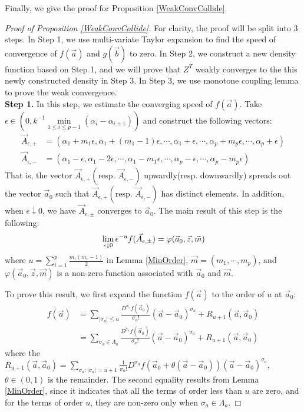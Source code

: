 Finally, we give the proof for Proposition \ref{WeakConvCollide}. 
\begin{proof}[Proof of Proposition \ref{WeakConvCollide}] For clarity, the proof will be split into $3$ steps. In Step 1, we use multi-variate Taylor expansion to find the speed of convergence of $f(\vec{a})$ and $g(\vec{b})$ to zero. In Step 2, we construct a new density function based on Step 1, and we will prove that $Z^{T}$ weakly converges to the this newly constructed density in Step 3. In Step 3, we use monotone coupling lemma to prove the weak convergence.\\
\textbf{Step 1. }In this step, we estimate the converging speed of $f(\vec{a})$. Take $\epsilon\in (0,k^{-1}\min\limits_{1\leq i\leq p-1}(\alpha_{i}-\alpha_{i+1}))$ and construct the following vectors:
\begin{align*}
	\vec{A}_{\epsilon,+}&=(\alpha_{1}+m_{1}\epsilon, \alpha_{1}+(m_{1}-1)\epsilon,\cdots,\alpha_{1}+\epsilon,\cdots,\alpha_{p}+m_{p}\epsilon,\cdots,\alpha_{p}+\epsilon)\\
	\vec{A}_{\epsilon,-}&=(\alpha_{1}-\epsilon, \alpha_{1}-2\epsilon,\cdots,\alpha_{1}-m_{1}\epsilon,\cdots,\alpha_{p}-\epsilon,\cdots,\alpha_{p}-m_{p}\epsilon)
\end{align*}
That is, the vector $\vec{A}_{\epsilon,+}(\text{resp. }\vec{A}_{\epsilon,-})$ upwardly(resp. downwardly) spreads out the vector $\vec{a}_{0}$ such that $\vec{A}_{\epsilon,+}(\text{resp. }\vec{A}_{\epsilon,-})$ has distinct elements. In addition, when $\epsilon\downarrow 0$, we have $\vec{A}_{\epsilon,\pm}$ converges to $\vec{a}_{0}$. The main result of this step is the following:
\begin{align}{\label{ConvSpeed}}
	\lim_{\epsilon\downarrow 0}\epsilon^{-u}f(\vec{A}_{\epsilon,\pm})=\varphi(\vec{a}_{0},\vec{z},\vec{m})
\end{align}
where $u=\sum_{i=1}^{p}\frac{m_{i}(m_{i}-1)}{2}$ in Lemma \ref{MinOrder}, $\vec{m}=(m_{1},\cdots,m_{p})$, and $\varphi(\vec{a}_{0},\vec{z},\vec{m})$ is a non-zero function associated with $\vec{a}_{0}$ and $\vec{m}$.

To prove this result, we first expand the function $f(\vec{a})$ to the order of $u$ at $\vec{a}_{0}$:
\begin{align*}
	f(\vec{a})&=\sum_{|\sigma_{a}|\leq u}\frac{D^{\sigma_{a}}f(\vec{a}_{0})}{\sigma_{a}!}(\vec{a}-\vec{a}_{0})^{\sigma_{a}}+R_{u+1}(\vec{a},\vec{a}_{0})\\
	&= \sum_{\sigma_{a}\in \Lambda_{a}}\frac{D^{\sigma_{a}}f(\vec{a}_{0})}{\sigma_{a}!}(\vec{a}-\vec{a}_{0})^{\sigma_{a}}+R_{u+1}(\vec{a},\vec{a}_{0})
\end{align*} 
where the $R_{u+1}(\vec{a},\vec{a}_{0})=\sum_{\sigma_{a}:|\sigma_{a}|=u+1}\frac{1}{\sigma_{a}!}D^{\sigma_{a}}f(\vec{a}_{0}+\theta(\vec{a}-\vec{a}_{0}))(\vec{a}-\vec{a}_{0})^{\sigma_{a}}$, $\theta\in(0,1)$ is the remainder. The second equality results from Lemma \ref{MinOrder}, since it indicates that all the terms of order less than $u$ are zero, and for the terms of order $u$, they are non-zero only when $\sigma_{a}\in\Lambda_{a}$.


\end{proof}
